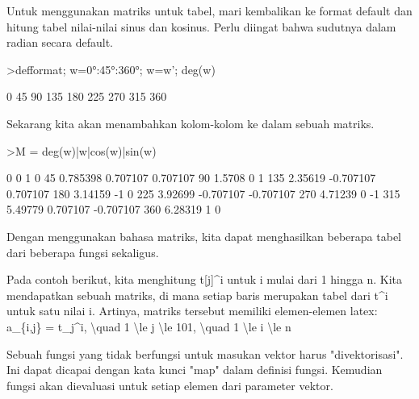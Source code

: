 \documentclass[12pt,arial,letterpaper]{book}
\begin{document}
\begin{eulercomment}
\begin{eulercomment}
\begin{eulercomment}
\begin{eulercomment}
\begin{eulercomment}
\begin{eulercomment}
\begin{euleroutput}
  [1,  2,  3,  4,  5,  6,  7,  8,  9]
\end{euleroutput}
\begin{eulercomment}
Untuk menggunakan matriks untuk tabel, mari kembalikan ke format
default dan hitung tabel nilai-nilai sinus dan kosinus. Perlu diingat
bahwa sudutnya dalam radian secara default.
\end{eulercomment}
\begin{eulerprompt}
>defformat; w=0°:45°:360°; w=w'; deg(w)
\end{eulerprompt}
\begin{euleroutput}
              0 
             45 
             90 
            135 
            180 
            225 
            270 
            315 
            360 
\end{euleroutput}
\begin{eulercomment}
Sekarang kita akan menambahkan kolom-kolom ke dalam sebuah matriks.
\end{eulercomment}
\begin{eulerprompt}
>M = deg(w)|w|cos(w)|sin(w)
\end{eulerprompt}
\begin{euleroutput}
              0             0             1             0 
             45      0.785398      0.707107      0.707107 
             90        1.5708             0             1 
            135       2.35619     -0.707107      0.707107 
            180       3.14159            -1             0 
            225       3.92699     -0.707107     -0.707107 
            270       4.71239             0            -1 
            315       5.49779      0.707107     -0.707107 
            360       6.28319             1             0 
\end{euleroutput}
\begin{eulercomment}
Dengan menggunakan bahasa matriks, kita dapat menghasilkan beberapa
tabel dari beberapa fungsi sekaligus.

Pada contoh berikut, kita menghitung t[j]\textasciicircum{}i untuk i mulai dari 1
hingga n. Kita mendapatkan sebuah matriks, di mana setiap baris
merupakan tabel dari t\textasciicircum{}i untuk satu nilai i. Artinya, matriks tersebut
memiliki elemen-elemen latex: a\_\{i,j\} = t\_j\textasciicircum{}i, \textbackslash{}quad 1 \textbackslash{}le j \textbackslash{}le 101,
\textbackslash{}quad 1 \textbackslash{}le i \textbackslash{}le n

Sebuah fungsi yang tidak berfungsi untuk masukan vektor harus
"divektorisasi". Ini dapat dicapai dengan kata kunci "map" dalam
definisi fungsi. Kemudian fungsi akan dievaluasi untuk setiap elemen
dari parameter vektor.


\end{eulercomment}
\end{eulercomment}
\end{eulercomment}
\end{eulercomment}
\end{eulercomment}
\end{eulercomment}
\end{eulercomment}
\end{document}
